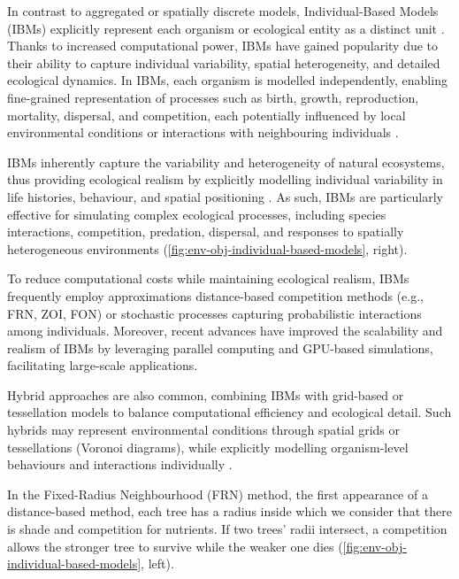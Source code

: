 In contrast to aggregated or spatially discrete models, Individual-Based Models (IBMs) explicitly represent each organism or ecological entity as a distinct unit \cite{Crooks2017}. Thanks to increased computational power, IBMs have gained popularity due to their ability to capture individual variability, spatial heterogeneity, and detailed ecological dynamics. In IBMs, each organism is modelled independently, enabling fine-grained representation of processes such as birth, growth, reproduction, mortality, dispersal, and competition, each potentially influenced by local environmental conditions or interactions with neighbouring individuals \cite{Chng2013,Peytavie2024a}.

IBMs inherently capture the variability and heterogeneity of natural ecosystems, thus providing ecological realism by explicitly modelling individual variability in life histories, behaviour, and spatial positioning \cite{McLane2011,Zhang2020}. As such, IBMs are particularly effective for simulating complex ecological processes, including species interactions, competition, predation, dispersal, and responses to spatially heterogeneous environments (\cref{fig:env-obj-individual-based-models}, right).

To reduce computational costs while maintaining ecological realism, IBMs frequently employ approximations distance-based competition methods (e.g., FRN, ZOI, FON) or stochastic processes capturing probabilistic interactions among individuals. Moreover, recent advances have improved the scalability and realism of IBMs by leveraging parallel computing and GPU-based simulations, facilitating large-scale applications.

Hybrid approaches are also common, combining IBMs with grid-based or tessellation models to balance computational efficiency and ecological detail. Such hybrids may represent environmental conditions through spatial grids or tessellations (Voronoi diagrams), while explicitly modelling organism-level behaviours and interactions individually \cite{Chng2011a}.


In the Fixed-Radius Neighbourhood (FRN) method, the first appearance of a distance-based method, each tree has a radius inside which we consider that there is shade and competition for nutrients. If two trees' radii intersect, a competition allows the stronger tree to survive while the weaker one dies (\cref{fig:env-obj-individual-based-models}, left).

